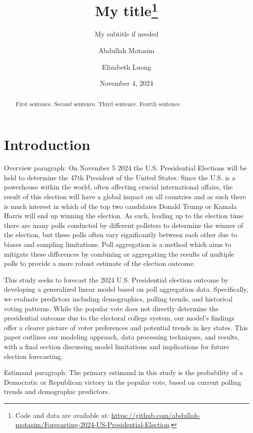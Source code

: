 \documentclass[
  letterpaper,
  DIV=11,
  numbers=noendperiod]{scrartcl}
\title{My title\thanks{Code and data are available at:
\url{https://github.com/abdullah-motasim/Forecasting-2024-US-Presidential-Election}.}}
\subtitle{My subtitle if needed}
\author{Abdullah Motasim \and Elizabeth Luong}
\date{November 4, 2024}
\renewcommand*\contentsname{Table of contents}
\newcommand\contentsname{Table of contents}
\begin{document}
\maketitle
\begin{abstract}
First sentence. Second sentence. Third sentence. Fourth sentence.
\end{abstract}

\renewcommand*\contentsname{Table of contents}
{
\hypersetup{linkcolor=}
\setcounter{tocdepth}{2}
\tableofcontents
}

\section{Introduction}\label{introduction}

Overview paragraph: On November 5 2024 the U.S. Presidential Elections
will be held to determine the 47th President of the United States. Since
the U.S. is a powerhouse within the world, often affecting crucial
international affairs, the result of this election will have a global
impact on all countries and as such there is much interest in which of
the top two candidates Donald Trump or Kamala Harris will end up winning
the election. As such, leading up to the election time there are many
polls conducted by different pollsters to determine the winner of the
election, but these polls often vary significantly between each other
due to biases and sampling limitations. Poll aggregation is a method
which aims to mitigate these differences by combining or aggregating the
results of multiple polls to provide a more robust estimate of the
election outcome.

This study seeks to forecast the 2024 U.S. Presidential election outcome
by developing a generalized linear model based on poll aggregation data.
Specifically, we evaluate predictors including demographics, polling
trends, and historical voting patterns. While the popular vote does not
directly determine the presidential outcome due to the electoral college
system, our model's findings offer a clearer picture of voter
preferences and potential trends in key states. This paper outlines our
modeling approach, data processing techniques, and results, with a final
section discussing model limitations and implications for future
election forecasting.

Estimand paragraph: The primary estimand in this study is the
probability of a Democratic or Republican victory in the popular vote,
based on current polling trends and demographic predictors.
\end{document}
